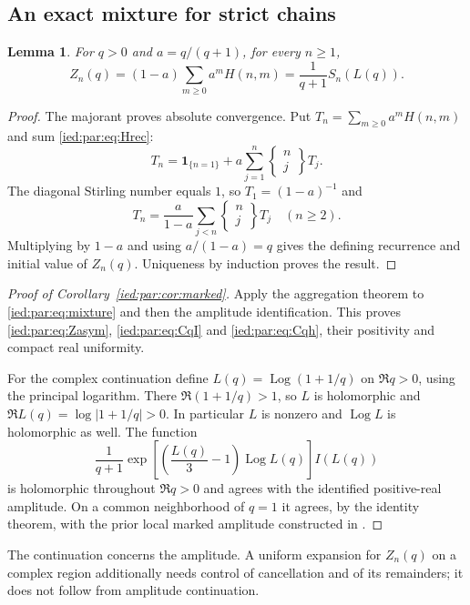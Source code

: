 \documentclass[11pt,letterpaper]{article}
\newtheorem{lemma}[theorem]{Lemma}
\theoremstyle{remark}\newtheorem{remark}[theorem]{Remark}
\newcommand{\Log}{\operatorname{Log}}
\begin{document}
\subsection{An exact mixture for strict chains}
\begin{lemma}\label{ied:par:lem:mixture}
For $q>0$ and $a=q/(q+1)$, for every $n\ge1$,
\begin{equation}\label{ied:par:eq:mixture}
 Z_n(q)=(1-a)\sum_{m\ge0}a^mH(n,m)
       =\frac1{q+1}S_n(L(q)).
\end{equation}
\end{lemma}
\begin{proof}
The majorant proves absolute convergence.
Put $T_n=\sum_{m\ge0}a^mH(n,m)$ and sum \eqref{ied:par:eq:Hrec}:
\[
 T_n=\mathbf1_{\{n=1\}}+
 a\sum_{j=1}^{n}
 \left\{\begin{matrix}n\\j\end{matrix}\right\}T_j.
\]
The diagonal Stirling number equals $1$, so $T_1=(1-a)^{-1}$ and
\[
 T_n=\frac{a}{1-a}\sum_{j<n}
 \left\{\begin{matrix}n\\j\end{matrix}\right\}T_j
 \quad(n\ge2).
\]
Multiplying by $1-a$ and using $a/(1-a)=q$ gives the defining recurrence
and initial value of $Z_n(q)$. Uniqueness by induction proves the result.
\end{proof}

\begin{proof}[Proof of Corollary~\ref{ied:par:cor:marked}]
Apply the aggregation theorem to \eqref{ied:par:eq:mixture} and then the
amplitude identification. This proves \eqref{ied:par:eq:Zasym},
\eqref{ied:par:eq:CqI} and \eqref{ied:par:eq:Cqh}, their positivity and compact real
uniformity.

For the complex continuation define
$L(q)=\Log(1+1/q)$ on $\Re q>0$, using the principal logarithm.
There $\Re(1+1/q)>1$, so $L$ is holomorphic and
$\Re L(q)=\log|1+1/q|>0$.
In particular $L$ is nonzero and $\Log L$ is holomorphic as well.
The function
\[
 \frac1{q+1}
 \exp\!\left[\left(\frac{L(q)}3-1\right)\Log L(q)\right]I(L(q))
\]
is holomorphic throughout $\Re q>0$ and agrees with the identified
positive-real amplitude. On a common neighborhood of $q=1$ it agrees,
by the identity theorem, with the prior local marked amplitude
constructed in \cite{Chains}.
\end{proof}

The continuation concerns the amplitude. A uniform expansion for
$Z_n(q)$ on a complex region additionally needs control of cancellation
and of its remainders; it does not follow from amplitude continuation.
\end{document}
